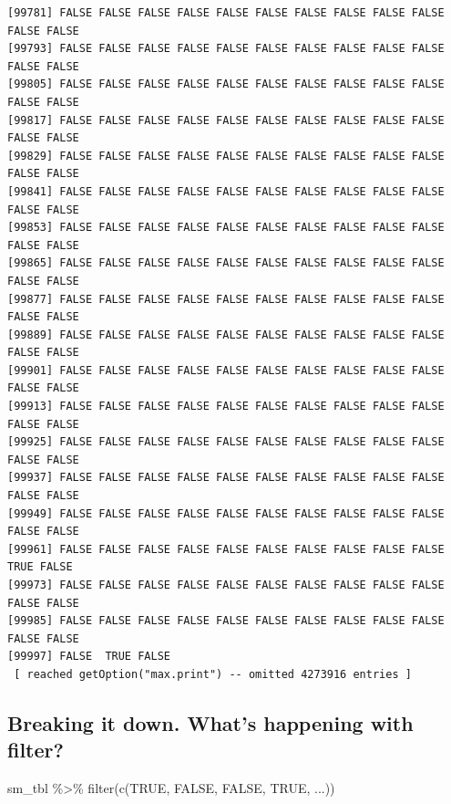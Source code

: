 \documentclass[
  a4paper,
  DIV=11,
  numbers=noendperiod]{scrartcl}
\newenvironment{Shaded}{\begin{snugshade}}{\end{snugshade}}
\newcommand{\ConstantTok}[1]{\textcolor[rgb]{0.56,0.35,0.01}{#1}}
\newcommand{\FunctionTok}[1]{\textcolor[rgb]{0.28,0.35,0.67}{#1}}
\newcommand{\NormalTok}[1]{\textcolor[rgb]{0.00,0.23,0.31}{#1}}
\newcommand{\SpecialCharTok}[1]{\textcolor[rgb]{0.37,0.37,0.37}{#1}}
\begin{document}
\begin{verbatim}
[99781] FALSE FALSE FALSE FALSE FALSE FALSE FALSE FALSE FALSE FALSE FALSE FALSE
[99793] FALSE FALSE FALSE FALSE FALSE FALSE FALSE FALSE FALSE FALSE FALSE FALSE
[99805] FALSE FALSE FALSE FALSE FALSE FALSE FALSE FALSE FALSE FALSE FALSE FALSE
[99817] FALSE FALSE FALSE FALSE FALSE FALSE FALSE FALSE FALSE FALSE FALSE FALSE
[99829] FALSE FALSE FALSE FALSE FALSE FALSE FALSE FALSE FALSE FALSE FALSE FALSE
[99841] FALSE FALSE FALSE FALSE FALSE FALSE FALSE FALSE FALSE FALSE FALSE FALSE
[99853] FALSE FALSE FALSE FALSE FALSE FALSE FALSE FALSE FALSE FALSE FALSE FALSE
[99865] FALSE FALSE FALSE FALSE FALSE FALSE FALSE FALSE FALSE FALSE FALSE FALSE
[99877] FALSE FALSE FALSE FALSE FALSE FALSE FALSE FALSE FALSE FALSE FALSE FALSE
[99889] FALSE FALSE FALSE FALSE FALSE FALSE FALSE FALSE FALSE FALSE FALSE FALSE
[99901] FALSE FALSE FALSE FALSE FALSE FALSE FALSE FALSE FALSE FALSE FALSE FALSE
[99913] FALSE FALSE FALSE FALSE FALSE FALSE FALSE FALSE FALSE FALSE FALSE FALSE
[99925] FALSE FALSE FALSE FALSE FALSE FALSE FALSE FALSE FALSE FALSE FALSE FALSE
[99937] FALSE FALSE FALSE FALSE FALSE FALSE FALSE FALSE FALSE FALSE FALSE FALSE
[99949] FALSE FALSE FALSE FALSE FALSE FALSE FALSE FALSE FALSE FALSE FALSE FALSE
[99961] FALSE FALSE FALSE FALSE FALSE FALSE FALSE FALSE FALSE FALSE  TRUE FALSE
[99973] FALSE FALSE FALSE FALSE FALSE FALSE FALSE FALSE FALSE FALSE FALSE FALSE
[99985] FALSE FALSE FALSE FALSE FALSE FALSE FALSE FALSE FALSE FALSE FALSE FALSE
[99997] FALSE  TRUE FALSE
 [ reached getOption("max.print") -- omitted 4273916 entries ]
\end{verbatim}

\hypertarget{breaking-it-down.-whats-happening-with-filter}{%
\subsection{Breaking it down. What's happening with
filter?}\label{breaking-it-down.-whats-happening-with-filter}}

\begin{Shaded}
\begin{Highlighting}[]
\NormalTok{sm\_tbl }\SpecialCharTok{\%\textgreater{}\%}
    \FunctionTok{filter}\NormalTok{(}\FunctionTok{c}\NormalTok{(}\ConstantTok{TRUE}\NormalTok{, }\ConstantTok{FALSE}\NormalTok{, }\ConstantTok{FALSE}\NormalTok{, }\ConstantTok{TRUE}\NormalTok{, ...))}
\end{Highlighting}
\end{Shaded}
\end{document}
